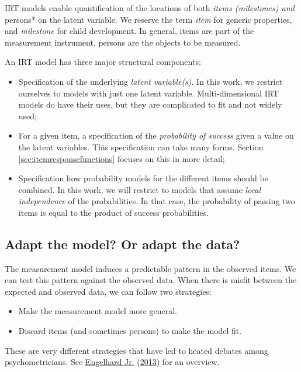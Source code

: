 \documentclass[
]{book}
\begin{document}
IRT models enable quantification of the locations of both \emph{items (milestones) and} persons* on the latent variable. We reserve the term \emph{item} for generic properties, and \emph{milestone} for child development. In general, items are part of the measurement instrument, persons are the objects to be measured.

An IRT model has three major structural components:

\begin{itemize}
\item
  Specification of the underlying \emph{latent variable(s)}. In this work, we restrict ourselves to models with just one latent variable. Multi-dimensional IRT models do have their uses, but they are complicated to fit and not widely used;
\item
  For a given item, a specification of the \emph{probability of success} given a value on the latent variables. This specification can take many forms. Section \ref{sec:itemresponsefunctions} focuses on this in more detail;
\item
  Specification how probability models for the different items should be combined. In this work, we will restrict to models that assume \emph{local independence} of the probabilities. In that case, the probability of passing two items is equal to the product of success probabilities.
\end{itemize}

\hypertarget{sec:adaptmodel}{%
\subsection{Adapt the model? Or adapt the data?}\label{sec:adaptmodel}}

The measurement model induces a predictable pattern in the observed items. We can test this pattern against the observed data. When there is misfit between the expected and observed data, we can follow two strategies:

\begin{itemize}
\item
  Make the measurement model more general.
\item
  Discard items (and sometimes persons) to make the model fit.
\end{itemize}

These are very different strategies that have led to heated debates among psychometricians. See \protect\hyperlink{ref-engelhard2013}{Engelhard Jr.} (\protect\hyperlink{ref-engelhard2013}{2013}) for an overview.
\end{document}
